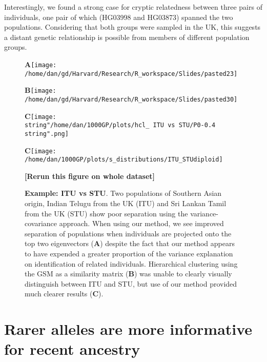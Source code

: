 \documentclass[english]{article}
\begin{document}
Interestingly, we found a strong case for cryptic relatedness between
three pairs of individuals, one pair of which (HG03998 and HG03873)
spanned the two populations. Considering that both groups were sampled
in the UK, this suggests a distant genetic relationship is possible
from members of different population groups.

\begin{figure}
\textbf{A}\texttt{[image: /home/dan/gd/Harvard/Research/R\_workspace/Slides/pasted23]}

\textbf{B}\texttt{[image: /home/dan/gd/Harvard/Research/R\_workspace/Slides/pasted30]}

\textbf{C}\texttt{[image: \\string"/home/dan/1000GP/plots/hcl\_ ITU vs STU/P0-0.4\\string".png]}

\textbf{C}\texttt{[image: /home/dan/1000GP/plots/s\_distributions/ITU\_STUdiploid]}

\textbf{{[}Rerun this figure on whole dataset{]}}\caption{\textbf{Example: ITU vs STU}. Two populations of Southern Asian origin,
Indian Telugu from the UK (ITU) and Sri Lankan Tamil from the UK (STU)
show poor separation using the variance-covariance approach. When
using our method, we see improved separation of populations when individuals
are projected onto the top two eigenvectors (\textbf{A}) despite the
fact that our method appears to have expended a greater proportion
of the variance explanation on identification of related individuals.
Hierarchical clustering using the GSM as a similarity matrix (\textbf{B})
was unable to clearly visually distinguish between ITU and STU, but
use of our method provided much clearer results (\textbf{C}). }
\label{fig:heatmaps}
\end{figure}



\section*{Rarer alleles are more informative for recent ancestry}
\end{document}
